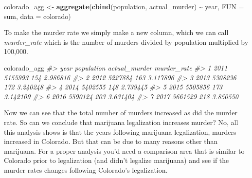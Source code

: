 \documentclass[
  12pt,
]{book}
\newenvironment{Shaded}{\begin{snugshade}}{\end{snugshade}}
\newcommand{\CommentTok}[1]{\textcolor[rgb]{0.56,0.35,0.01}{\textit{#1}}}
\newcommand{\DataTypeTok}[1]{\textcolor[rgb]{0.13,0.29,0.53}{#1}}
\newcommand{\DecValTok}[1]{\textcolor[rgb]{0.00,0.00,0.81}{#1}}
\newcommand{\KeywordTok}[1]{\textcolor[rgb]{0.13,0.29,0.53}{\textbf{#1}}}
\newcommand{\NormalTok}[1]{#1}
\newcommand{\OperatorTok}[1]{\textcolor[rgb]{0.81,0.36,0.00}{\textbf{#1}}}
\newcommand{\StringTok}[1]{\textcolor[rgb]{0.31,0.60,0.02}{#1}}
\begin{document}
\begin{Shaded}
\begin{Highlighting}[]
\NormalTok{colorado\_agg <{-}}\StringTok{ }\KeywordTok{aggregate}\NormalTok{(}\KeywordTok{cbind}\NormalTok{(population, actual\_murder) }\OperatorTok{\textasciitilde{}}\StringTok{ }\NormalTok{year, }\DataTypeTok{FUN =}\NormalTok{ sum, }\DataTypeTok{data =}\NormalTok{ colorado)}
\end{Highlighting}
\end{Shaded}

To make the murder rate we simply make a new column, which we can call \emph{murder\_rate} which is the number of murders divided by population multiplied by 100,000.

\begin{Shaded}
\end{Shaded}

\begin{Shaded}
\begin{Highlighting}[]
\NormalTok{colorado\_agg}
\CommentTok{\#>   year population actual\_murder murder\_rate}
\CommentTok{\#> 1 2011    5155993           154    2.986816}
\CommentTok{\#> 2 2012    5227884           163    3.117896}
\CommentTok{\#> 3 2013    5308236           172    3.240248}
\CommentTok{\#> 4 2014    5402555           148    2.739445}
\CommentTok{\#> 5 2015    5505856           173    3.142109}
\CommentTok{\#> 6 2016    5590124           203    3.631404}
\CommentTok{\#> 7 2017    5661529           218    3.850550}
\end{Highlighting}
\end{Shaded}

Now we can see that the total number of murders increased as did the murder rate. So can we conclude that marijuana legalization increases murder? No, all this analysis shows is that the years following marijuana legalization, murders increased in Colorado. But that can be due to many reasons other than marijuana. For a proper analysis you'd need a comparison area that is similar to Colorado prior to legalization (and didn't legalize marijuana) and see if the murder rates changes following Colorado's legalization.
\end{document}
